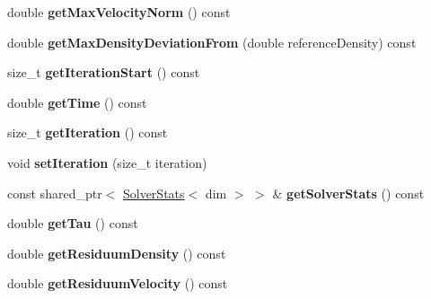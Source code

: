\begin{DoxyCompactItemize}
\item 
\hypertarget{classnatrium_1_1CFDSolver_ae9c44bb0f33e2c73ee96fbe100061842}{
double {\bfseries getMaxVelocityNorm} () const }
\label{classnatrium_1_1CFDSolver_ae9c44bb0f33e2c73ee96fbe100061842}

\item 
\hypertarget{classnatrium_1_1CFDSolver_ade641431988a82cb47d88a9d600e1c92}{
double {\bfseries getMaxDensityDeviationFrom} (double referenceDensity) const }
\label{classnatrium_1_1CFDSolver_ade641431988a82cb47d88a9d600e1c92}

\item 
\hypertarget{classnatrium_1_1CFDSolver_a33c4bfd63b8d457a5bc15f0c0da02c38}{
size\_\-t {\bfseries getIterationStart} () const }
\label{classnatrium_1_1CFDSolver_a33c4bfd63b8d457a5bc15f0c0da02c38}

\item 
\hypertarget{classnatrium_1_1CFDSolver_a8e3686b16794c0040bd5cc7cf9fe98d3}{
double {\bfseries getTime} () const }
\label{classnatrium_1_1CFDSolver_a8e3686b16794c0040bd5cc7cf9fe98d3}

\item 
\hypertarget{classnatrium_1_1CFDSolver_a3c0920e02df800abcfb8f82518cab0ca}{
size\_\-t {\bfseries getIteration} () const }
\label{classnatrium_1_1CFDSolver_a3c0920e02df800abcfb8f82518cab0ca}

\item 
\hypertarget{classnatrium_1_1CFDSolver_a97546801de9259206f9611c14ce9ff1d}{
void {\bfseries setIteration} (size\_\-t iteration)}
\label{classnatrium_1_1CFDSolver_a97546801de9259206f9611c14ce9ff1d}

\item 
\hypertarget{classnatrium_1_1CFDSolver_ab40725ea85fde34033d92027d13a4b06}{
const shared\_\-ptr$<$ \hyperlink{classnatrium_1_1SolverStats}{SolverStats}$<$ dim $>$ $>$ \& {\bfseries getSolverStats} () const }
\label{classnatrium_1_1CFDSolver_ab40725ea85fde34033d92027d13a4b06}

\item 
\hypertarget{classnatrium_1_1CFDSolver_abcce31d3ba9b00e148780b6c855d189b}{
double {\bfseries getTau} () const }
\label{classnatrium_1_1CFDSolver_abcce31d3ba9b00e148780b6c855d189b}

\item 
\hypertarget{classnatrium_1_1CFDSolver_a1a508263caff799245a183989efd6680}{
double {\bfseries getResiduumDensity} () const }
\label{classnatrium_1_1CFDSolver_a1a508263caff799245a183989efd6680}

\item 
\hypertarget{classnatrium_1_1CFDSolver_a051ad2daa843e9edf9f1243b3c062686}{
double {\bfseries getResiduumVelocity} () const }
\label{classnatrium_1_1CFDSolver_a051ad2daa843e9edf9f1243b3c062686}

\end{DoxyCompactItemize}
